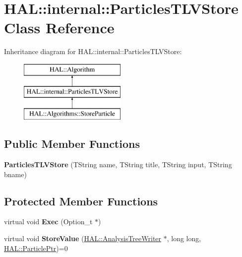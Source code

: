 \hypertarget{class_h_a_l_1_1internal_1_1_particles_t_l_v_store}{\section{H\-A\-L\-:\-:internal\-:\-:Particles\-T\-L\-V\-Store Class Reference}
\label{class_h_a_l_1_1internal_1_1_particles_t_l_v_store}
}
Inheritance diagram for H\-A\-L\-:\-:internal\-:\-:Particles\-T\-L\-V\-Store\-:\begin{figure}[H]
\begin{center}
\leavevmode
\includegraphics[height=3.000000cm]{class_h_a_l_1_1internal_1_1_particles_t_l_v_store}
\end{center}
\end{figure}
\subsection*{Public Member Functions}
\begin{DoxyCompactItemize}
\item 
\hypertarget{class_h_a_l_1_1internal_1_1_particles_t_l_v_store_a82b349381916c82795bddbeea8fb7f96}{{\bfseries Particles\-T\-L\-V\-Store} (T\-String name, T\-String title, T\-String input, T\-String bname)}\label{class_h_a_l_1_1internal_1_1_particles_t_l_v_store_a82b349381916c82795bddbeea8fb7f96}

\end{DoxyCompactItemize}
\subsection*{Protected Member Functions}
\begin{DoxyCompactItemize}
\item 
\hypertarget{class_h_a_l_1_1internal_1_1_particles_t_l_v_store_a4d15dd8ea0c828581b3a5654131d45b9}{virtual void {\bfseries Exec} (Option\-\_\-t $\ast$)}\label{class_h_a_l_1_1internal_1_1_particles_t_l_v_store_a4d15dd8ea0c828581b3a5654131d45b9}

\item 
\hypertarget{class_h_a_l_1_1internal_1_1_particles_t_l_v_store_a4d7c4b29cb00b7bdada55289dcd0a86e}{virtual void {\bfseries Store\-Value} (\hyperlink{class_h_a_l_1_1_analysis_tree_writer}{H\-A\-L\-::\-Analysis\-Tree\-Writer} $\ast$, long long, \hyperlink{class_h_a_l_1_1_generic_particle}{H\-A\-L\-::\-Particle\-Ptr})=0}\label{class_h_a_l_1_1internal_1_1_particles_t_l_v_store_a4d7c4b29cb00b7bdada55289dcd0a86e}

\end{DoxyCompactItemize}
